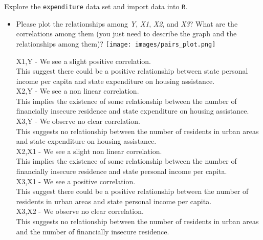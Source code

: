\documentclass[12pt,letterpaper]{article}
\begin{document}
\vspace{.5cm}
\noindent Explore the \texttt{expenditure} data set and import data into \texttt{R}.
\vspace{.5cm}

\vspace{.5cm}

\begin{itemize}

\newpage
\item
Please plot the relationships among \emph{Y}, \emph{X1}, \emph{X2}, and \emph{X3}? What are the correlations among them (you just need to describe the graph and the relationships among them)?
\vspace{.5cm}
\texttt{[image: images/pairs\_plot.png]}



X1,Y -  We see a slight positive correlation.\\
		This suggest there could be a positive relationship between state personal income per capita and state expenditure on housing assistance.\\
		

X2,Y - We see a non linear correlation.\\
		This implies the existence of some relationship between the number of financially insecure residence and state expenditure on housing assistance.\\
		

X3,Y - We observe no clear correlation.\\
		This suggests no relationship between the number of residents in urban areas and state expenditure on housing assistance.\\

X2,X1 - We see a slight non linear correlation.\\
		This implies the existence of some relationship between the number of financially insecure residence and state personal income per capita.\\

X3,X1 - We see a positive correlation.\\
		This suggest there could be a positive relationship between the number of residents in urban areas and state personal income per capita.\\
		
		 
X3,X2 - We observe no clear correlation.\\
		This suggests no relationship between the number of residents in urban areas and the number of financially insecure residence.\\




\end{itemize}
\end{document}

